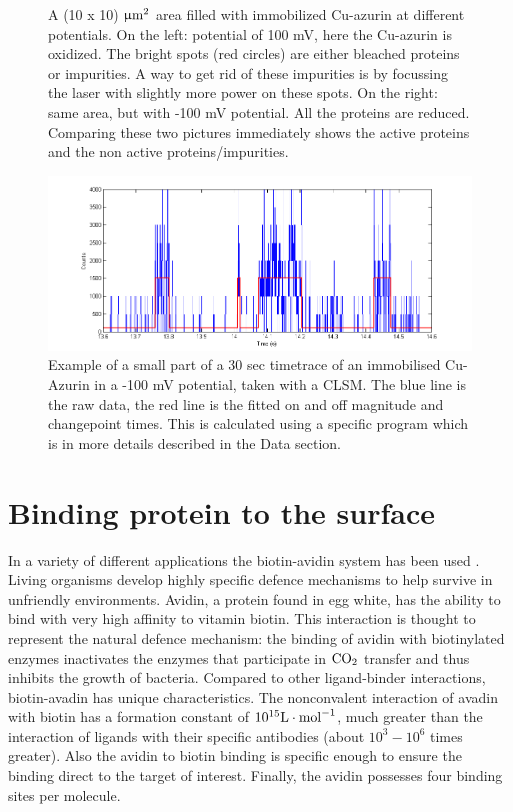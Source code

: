 \documentclass[twoside,single]{lion-msc}
\begin{document}
\begin{figure}
\begin{subfigure}{.5\textwidth}
  \label{}
\end{subfigure}
\caption{A  (10 x 10) $\upmu \textup{m}^{2}$  area filled with immobilized Cu-azurin at different potentials. On the left: potential of 100 mV, here the Cu-azurin is oxidized. The bright spots (red circles) are either bleached proteins or impurities. A way to get rid of these impurities is by focussing the laser with slightly more power on these spots. On the right: same area, but with -100 mV potential. All the proteins are reduced. Comparing these two pictures immediately shows the active proteins and the non active proteins/impurities.}
\label{finding_proteins_1}
\end{figure}


\begin{figure}[ht!]
\centering
\includegraphics[width= \textwidth]{TT_example}
\caption{Example of a small part of a 30 sec timetrace of an immobilised Cu-Azurin in a -100 mV potential, taken with a CLSM. The blue line is the raw data, the red line is the fitted on and off magnitude and changepoint times. This is calculated using a specific program which is in more details described in the Data section.} 
\label{TT_exam}
\end{figure}

\section{Binding protein to the surface}\label{neutra}
In a variety of different applications the biotin-avidin system has been used \cite{Diamandis1991}. Living organisms develop highly specific defence mechanisms to help survive in unfriendly environments. Avidin, a protein found in egg white, has the ability to bind with very high affinity to vitamin biotin. This interaction is thought to represent the natural defence mechanism: the binding of avidin with biotinylated enzymes inactivates the enzymes that participate in $\textup{CO}_{2}$ transfer and thus inhibits the growth of bacteria. Compared to other  ligand-binder interactions, biotin-avadin has unique characteristics. The nonconvalent interaction of avadin with biotin has a formation constant of $10^{15}\textup{L}\cdot \textup{mol}^{-1}$, much greater than the interaction of ligands with their specific antibodies (about $10^{3}-10^{6}$ times greater). Also the avidin to biotin binding is specific enough to ensure the binding direct to the target of interest. Finally, the avidin possesses four binding sites per molecule. 
\end{document}
